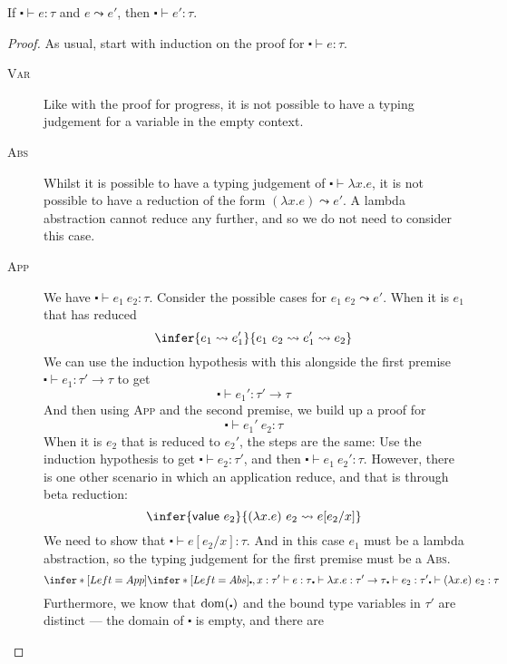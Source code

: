 \begin{theorem}[Preservation]\label{thm:preservation}
  If $\centerdot \vdash e : \tau$ and $e \leadsto e'$, then $\centerdot \vdash e' : \tau$.
\end{theorem}
\begin{proof}
  As usual, start with induction on the proof for $\centerdot \vdash e : \tau$.
  \begin{description}
  \item[\rm\textsc{Var}] Like with the proof for progress, it is not
    possible to have a typing judgement for a variable in the empty
    context.
  \item[\rm\textsc{Abs}] Whilst it is possible to have a typing
    judgement of $\centerdot \vdash \lambda x . e$, it is not possible to have a reduction
    of the form $(\lambda x . e) \leadsto e'$. A lambda abstraction cannot reduce
    any further, and so we do not need to consider this case.
  \item[\rm\textsc{App}] We have $\centerdot \vdash e_1 \ e_2 : \tau$. Consider the
    possible cases for $e_1 \ e_2 \leadsto e'$. When it is $e_1$ that has
    reduced
    \[ \infer{e_1 \leadsto e_1'}{e_1 \ e_2 \leadsto e_1' \leadsto e_2} \] We can use the
    induction hypothesis with this alongside the first premise
    ${\centerdot \vdash e_1 : \tau' \rightarrow \tau}$ to get
    \[ \centerdot \vdash e_1' : \tau' \rightarrow \tau \] And then using \textsc{App} and the second
    premise, we build up a proof for
    \[ \centerdot \vdash e_1' \ e_2 : \tau \]
    When it is $e_2$ that is reduced to $e_2'$, the steps are the same: Use the
    induction hypothesis to get $\centerdot \vdash e_2 : \tau'$, and then $\centerdot \vdash e_1 \
    e_2' : \tau$.
    However, there is one other scenario in which an application
    reduce, and that is through beta reduction:
    \[ \infer{\textsf{value} \ e_2}{ (\lambda x . e) \ e_2 \leadsto e [ e_2 / x ]
      } \]
    We need to
    show that $\centerdot \vdash e [ e_2 / x ] : \tau$.
    And in this case $e_1$ must be a lambda abstraction, so the
    typing judgement for the first premise must be a \textsc{Abs}.
    \[
      \infer*[Left=App]{ \infer*[Left=Abs]{\centerdot , x : \tau' \vdash e : \tau}{\centerdot \vdash \lambda x . e : \tau' \rightarrow \tau} \\ \centerdot \vdash e_2 : \tau' }
      {\centerdot \vdash (\lambda x . e) \ e_2  : \tau}
    \]
    Furthermore, we know that $\operatorname{dom}(\centerdot)$ and the bound type variables
    in $\tau'$ are distinct --- the domain of $\centerdot$ is empty, and there are

\end{description}
\end{proof}
